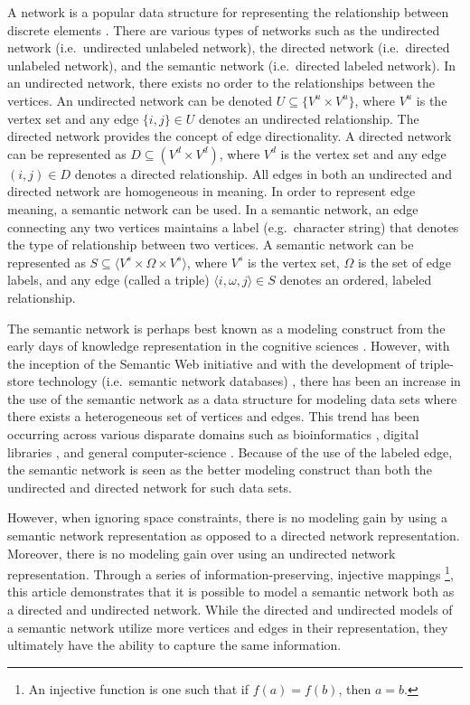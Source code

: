 \documentclass[twocolumn,preprintnumbers,amsmath,amssymb,letter]{revtex4}
\newcommand{\ra}{\rangle}
\newcommand{\la}{\langle}
\begin{document}
A network is a popular data structure for representing the relationship between discrete elements \cite{netanal:brandes2005,netsci:newman2006}. There are various types of networks such as the undirected network (i.e.~undirected unlabeled network), the directed network (i.e.~directed unlabeled network), and the semantic network (i.e.~directed labeled network). In an undirected network, there exists no order to the relationships between the vertices. An undirected network can be denoted $U \subseteq \{V^u \times V^u\}$, where $V^u$ is the vertex set and any edge $\{i,j\} \in U$ denotes an undirected relationship. The directed network provides the concept of edge directionality. A directed network can be represented as $D \subseteq (V^d \times V^d)$, where $V^d$ is the vertex set and any edge $(i,j) \in D$ denotes a directed relationship. All edges in both an undirected and directed network are homogeneous in meaning. In order to represent edge meaning, a semantic network can be used. In a semantic network, an edge connecting any two vertices maintains a label (e.g.~character string) that denotes the type of relationship between two vertices. A semantic network can be represented as $S \subseteq \la V^s \times \Omega \times V^s \ra$, where $V^s$ is the vertex set, $\Omega$ is the set of edge labels, and any edge (called a triple) $\la i,\omega,j \ra \in S$ denotes an ordered, labeled relationship.

The semantic network is perhaps best known as a modeling construct from the early days of knowledge representation in the cognitive sciences \cite{sowa:semantic1991}. However, with the inception of the Semantic Web initiative \cite{lee:semantic2001,pubsem:lee2001} and with the development of triple-store technology (i.e.~semantic network databases) \cite{lee:triple2004,oracle:alexander2006,agraph:aasman2006}, there has been an increase in the use of the semantic network as a data structure for modeling data sets where there exists a heterogeneous set of vertices and edges. This trend has been occurring across various disparate domains such as bioinformatics \cite{sembio:quan2003,sembio:ruttenberg2007}, digital libraries \cite{lib:bax2004,semever:bollen2007}, and general computer-science \cite{rodriguez:gpsemnet2007}. Because of the use of the labeled edge, the semantic network is seen as the better modeling construct  than both the undirected and directed network for such data sets.

However, when ignoring space constraints, there is no modeling gain by using a semantic network representation as opposed to a directed network representation. Moreover, there is no modeling gain over using an undirected network representation. Through a series of information-preserving, injective mappings \footnote{An injective function is one such that if $f(a) = f(b)$, then $a = b$.}, this article demonstrates that it is possible to model a semantic network both as a directed and undirected network. While the directed and undirected models of a semantic network utilize more vertices and edges in their representation, they ultimately have the ability to capture the same information.
\end{document}
